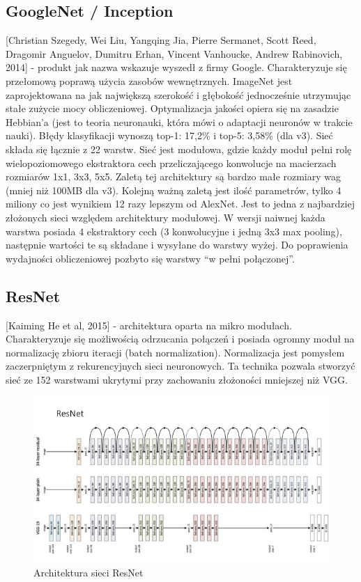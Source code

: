 \documentclass[12pt,a4paper,twoside,titlepage,openright]{book}
\begin{document}
{\subsection{GoogleNet / Inception}
[Christian Szegedy, Wei Liu, Yangqing Jia, Pierre Sermanet, Scott Reed, Dragomir Anguelov, Dumitru Erhan, Vincent Vanhoucke, Andrew Rabinovich, 2014] - produkt jak nazwa wskazuje wyszedł z firmy Google. Charakteryzuje się przełomową poprawą użycia zasobów wewnętrznych. ImageNet jest zaprojektowana na jak największą szerokość i głębokość jednocześnie utrzymując stałe zużycie mocy obliczeniowej. Optymalizacja jakości opiera się na zasadzie Hebbian’a (jest to teoria neuronauki, która mówi o adaptacji neuronów w trakcie nauki). Błędy klasyfikacji wynoszą top-1: 17,2\% i top-5: 3,58\% (dla v3). Sieć składa się łącznie z 22 warstw. Sieć jest modułowa, gdzie każdy moduł pełni rolę wielopoziomowego ekstraktora cech przeliczającego konwolucje na macierzach rozmiarów 1x1, 3x3, 5x5. Zaletą tej architektury są bardzo małe rozmiary wag (mniej niż 100MB dla v3). Kolejną ważną zaletą jest ilość parametrów, tylko 4 miliony co jest wynikiem 12 razy lepszym od AlexNet. Jest to jedna z najbardziej złożonych sieci względem architektury modułowej. W wersji naiwnej każda warstwa posiada 4 ekstraktory cech (3 konwolucyjne i jedną 3x3 max pooling), następnie wartości te są składane i wysyłane do warstwy wyżej. Do poprawienia wydajności obliczeniowej pozbyto się warstwy “w pełni połączonej”. \cite{DBLP:journals/corr/SzegedyLJSRAEVR14}

\subsection{ResNet}
[Kaiming He et al, 2015]  - architektura oparta na mikro modułach. Charakteryzuje się możliwością odrzucania połączeń i posiada ogromny moduł na normalizację zbioru iteracji (batch normalization). Normalizacja jest pomysłem zaczerpniętym z rekurencyjnych sieci neuronowych. Ta technika pozwala stworzyć sieć ze 152 warstwami ukrytymi przy zachowaniu złożoności mniejszej niż VGG. \cite{DBLP:journals/corr/XieGDTH16}
\begin{figure}[h]
	\centering
			\includegraphics[resolution=120]{ResNet.png}
		\caption{Architektura sieci ResNet}
\end{figure}

}
\end{document}
